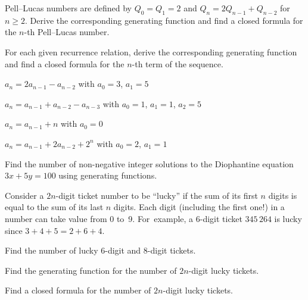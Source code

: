 \documentclass[a4paper,12pt]{article}
\begin{document}
\begin{tasks}[align=right,left=0pt]
    \item Pell--Lucas numbers are defined by $Q_{0} = Q_{1} = 2$ and $Q_{n} = 2 Q_{n-1} + Q_{n-2}$ for $n \geq 2$.
    Derive the corresponding generating function and find a closed formula for the $n$-th Pell--Lucas number.


    \item For each given recurrence relation, derive the corresponding generating function and find a closed formula for the $n$-th term of the sequence.

    \begin{subtasks}
        \item $a_n = 2a_{n-1} - a_{n-2}$ with $a_0 = 3$, $a_1 = 5$
        \item $a_{n} = a_{n-1} + a_{n-2} - a_{n-3}$ with $a_{0} = 1$, $a_{1} = 1$, $a_{2} = 5$
        \item $a_{n} = a_{n-1} + n$ with $a_0 = 0$
        \item $a_{n} = a_{n-1} + 2a_{n-2} + 2^n$ with $a_0 = 2$, $a_1 = 1$
    \end{subtasks}


    \item Find the number of non-negative integer solutions to the Diophantine equation $3x + 5y = 100$ using generating functions.


    \item Consider a $2n$-digit ticket number to be \enquote{lucky} if the sum of its first $n$ digits is equal to the sum of its last $n$ digits.
    Each digit (including the first one!) in a number can take value from 0 to~9.
    For~example, a 6-digit ticket $345\,264$ is lucky since $3+4+5 = 2+6+4$.

    \begin{subtasks}
        \item Find the number of lucky 6-digit and 8-digit tickets.
        \item Find the generating function for the number of $2n$-digit lucky tickets.
        \item Find a closed formula for the number of $2n$-digit lucky tickets.
    \end{subtasks}



\end{tasks}
\end{document}
